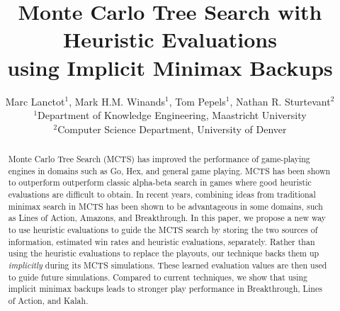 \documentclass{article}
\title{Monte Carlo Tree Search with Heuristic Evaluations\\using Implicit Minimax Backups}
\author{Marc Lanctot$^1$, Mark H.M. Winands$^1$, Tom Pepels$^1$, Nathan R. Sturtevant$^2$ \\
\hspace{-0.5cm}$^1$Department of Knowledge Engineering, Maastricht University\\
\hspace{-0.5cm}$^2$Computer Science Department, University of Denver\\
\vspace{0.3cm}
\hspace{-0.5cm}{\small\{marc.lanctot,m.winands,tom.pepels\}@maastrichtuniversity.nl, sturtevant@cs.du.edu}}
\date{}
\begin{document}
 


\maketitle
\allowdisplaybreaks

\begin{abstract} 
Monte Carlo Tree Search (MCTS) has improved the performance of game-playing engines in 
domains such as Go, Hex, and general game playing. MCTS has been shown to outperform
outperform classic alpha-beta search in games where good heuristic evaluations are difficult to obtain. 
In recent years, combining ideas from traditional minimax search in MCTS has been shown to be advantageous in some domains, 
such as Lines of Action, Amazons, and Breakthrough.
In this paper, we propose 
a new way to use heuristic evaluations to guide the MCTS search by storing the two sources of 
information, estimated win rates and heuristic evaluations, separately. 
Rather than using the heuristic evaluations to replace the playouts, 
our technique backs them up {\it implicitly} during its MCTS simulations. 
These learned evaluation values are then used to guide future simulations. 
Compared to current techniques, we show that using implicit minimax backups  
leads to stronger play performance in Breakthrough, Lines of Action, and Kalah. 
\end{abstract} 

%
%

\end{document}

